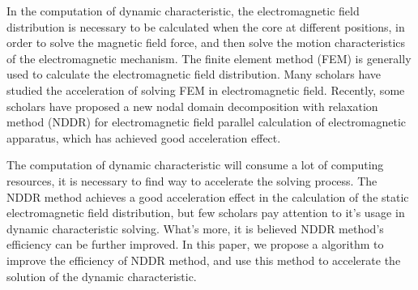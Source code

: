 \documentclass[journal,transmag]{IEEEtran}
\begin{document}
In the computation of dynamic characteristic, the electromagnetic field distribution is necessary to be calculated when the core at different positions, in order to solve the magnetic field force, and then solve the motion characteristics of the electromagnetic mechanism\cite{IEEEhowto:You}. The finite element method (FEM) is generally used to calculate the electromagnetic field distribution. Many scholars have studied the acceleration of solving FEM in electromagnetic field. Recently, some scholars have proposed a new nodal domain decomposition with relaxation method (NDDR) for electromagnetic field parallel calculation of electromagnetic apparatus, which has achieved good acceleration effect.  \cite{IEEEhowto:Liu}

The computation of dynamic characteristic will consume a lot of computing resources, it is necessary to find way to accelerate the solving process. The NDDR method achieves a good acceleration effect in the calculation of the static electromagnetic field distribution, but few scholars pay attention to it's usage in dynamic characteristic solving. What's more, it is believed NDDR method's efficiency can be further improved. In this paper, we propose a algorithm to improve the efficiency of NDDR method, and use this method to accelerate the solution of the dynamic characteristic. 
\end{document}
